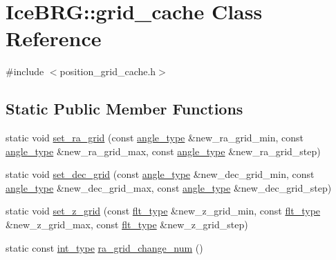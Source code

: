 \hypertarget{classIceBRG_1_1grid__cache}{}\section{Ice\+B\+R\+G\+:\+:grid\+\_\+cache Class Reference}
\label{classIceBRG_1_1grid__cache}


{\ttfamily \#include $<$position\+\_\+grid\+\_\+cache.\+h$>$}

\subsection*{Static Public Member Functions}
\begin{DoxyCompactItemize}
\item 
static void \hyperlink{classIceBRG_1_1grid__cache_a5da72ed9107ec519400d77e06bab2c7d}{set\+\_\+ra\+\_\+grid} (const \hyperlink{namespaceIceBRG_a688eeb0811a2474b20b667ed2e9625a1}{angle\+\_\+type} \&new\+\_\+ra\+\_\+grid\+\_\+min, const \hyperlink{namespaceIceBRG_a688eeb0811a2474b20b667ed2e9625a1}{angle\+\_\+type} \&new\+\_\+ra\+\_\+grid\+\_\+max, const \hyperlink{namespaceIceBRG_a688eeb0811a2474b20b667ed2e9625a1}{angle\+\_\+type} \&new\+\_\+ra\+\_\+grid\+\_\+step)
\item 
static void \hyperlink{classIceBRG_1_1grid__cache_aa7f3525ea2dfdba55384f44d758cb70a}{set\+\_\+dec\+\_\+grid} (const \hyperlink{namespaceIceBRG_a688eeb0811a2474b20b667ed2e9625a1}{angle\+\_\+type} \&new\+\_\+dec\+\_\+grid\+\_\+min, const \hyperlink{namespaceIceBRG_a688eeb0811a2474b20b667ed2e9625a1}{angle\+\_\+type} \&new\+\_\+dec\+\_\+grid\+\_\+max, const \hyperlink{namespaceIceBRG_a688eeb0811a2474b20b667ed2e9625a1}{angle\+\_\+type} \&new\+\_\+dec\+\_\+grid\+\_\+step)
\item 
static void \hyperlink{classIceBRG_1_1grid__cache_aea9ca8dd0b5fca1be55aec1e0dbbe7be}{set\+\_\+z\+\_\+grid} (const \hyperlink{lib_2IceBRG__main_2common_8h_ad0f130a56eeb944d9ef2692ee881ecc4}{flt\+\_\+type} \&new\+\_\+z\+\_\+grid\+\_\+min, const \hyperlink{lib_2IceBRG__main_2common_8h_ad0f130a56eeb944d9ef2692ee881ecc4}{flt\+\_\+type} \&new\+\_\+z\+\_\+grid\+\_\+max, const \hyperlink{lib_2IceBRG__main_2common_8h_ad0f130a56eeb944d9ef2692ee881ecc4}{flt\+\_\+type} \&new\+\_\+z\+\_\+grid\+\_\+step)
\item 
static const \hyperlink{lib_2IceBRG__main_2common_8h_ac4de9d9335536ac22821171deec8d39e}{int\+\_\+type} \hyperlink{classIceBRG_1_1grid__cache_a32deaffdf7dde6de1e9bfb5355e10f3f}{ra\+\_\+grid\+\_\+change\+\_\+num} ()

\end{DoxyCompactItemize}
